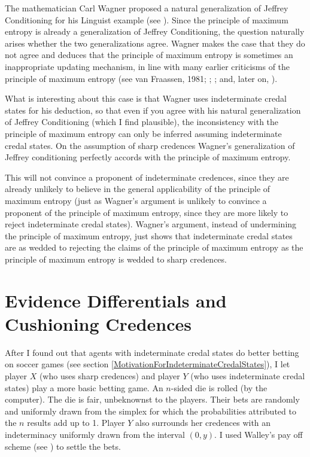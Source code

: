 The mathematician Carl Wagner proposed a natural
generalization of Jeffrey Conditioning for his Linguist
example (see ). Since the
principle of maximum entropy is already a
generalization of Jeffrey Conditioning, the question
naturally arises whether the two generalizations agree.
Wagner makes the case that they do not agree and
deduces that the principle of maximum entropy is
sometimes an inappropriate updating mechanism, in line
with many earlier criticisms of the principle of
maximum entropy (see van Fraassen, 1981;
; ;
and, later on, ).

What is interesting about this case is that Wagner uses
indeterminate credal states for his deduction, so that
even if you agree with his natural generalization of
Jeffrey Conditioning (which I find plausible), the
inconsistency with the principle of maximum entropy can
only be inferred assuming indeterminate credal states.
On the assumption of sharp credences Wagner's
generalization of Jeffrey conditioning perfectly
accords with the principle of maximum entropy.

This will not convince a proponent of indeterminate
credences, since they are already unlikely to believe
in the general applicability of the principle of
maximum entropy (just as Wagner's argument is unlikely
to convince a proponent of the principle of maximum
entropy, since they are more likely to reject
indeterminate credal states). Wagner's argument,
instead of undermining the principle of maximum
entropy, just shows that indeterminate credal states
are as wedded to rejecting the claims of the principle
of maximum entropy as the principle of maximum entropy
is wedded to sharp credences.

\section{Evidence Differentials and Cushioning
  Credences}
\label{WalleysWorldCupWoes}

After I found out that agents with indeterminate credal
states do better betting on soccer games (see section
\ref{MotivationForIndeterminateCredalStates}), I let
player $X$ (who uses sharp credences) and player $Y$
(who uses indeterminate credal states) play a more
basic betting game. An $n$-sided die is rolled (by the
computer). The die is fair, unbeknownst to the players.
Their bets are randomly and uniformly drawn from the
simplex for which the probabilities attributed to the
$n$ results add up to 1. Player $Y$ also surrounds her
credences with an indeterminacy uniformly drawn from
the interval $(0,y)$. I used Walley's pay off scheme
(see ) to settle the bets.

